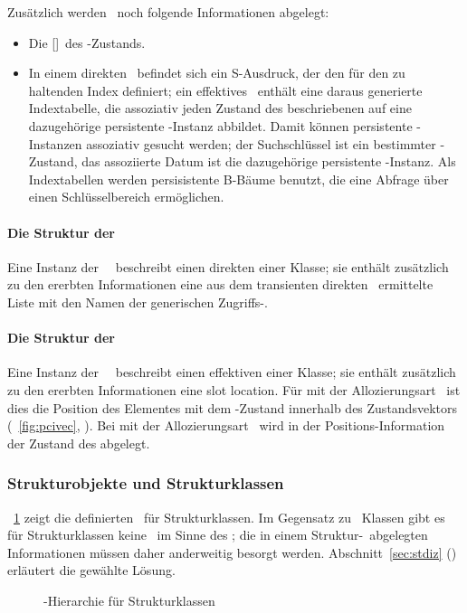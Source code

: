 %
Zus\"{a}tzlich werden \ua\ noch folgende Informationen abgelegt:
%
\begin{itemize}
%
\item Die []\ des \Slt\/-Zustands.
%
\item In einem direkten \sltdo\ befindet sich ein S-Ausdruck, der den
f\"{u}r den \Slt\/ zu haltenden Index definiert;
ein effektives \sltdo\ enth\"{a}lt eine daraus generierte Indextabelle,
die assoziativ jeden Zustand des beschriebenen \Slt[s]\/ auf eine
dazugeh\"{o}rige persistente \clos-Instanz abbildet. Damit k\"{o}n\-nen
persistente \clos-Instanzen assoziativ gesucht werden; der
Suchschl\"{u}ssel ist ein bestimmter \Slt\/-Zustand, das assoziierte Datum
ist die dazugeh\"{o}rige persistente \clos-Instanz. Als Indextabellen
werden persisistente B-B\"{a}ume benutzt, die eine Abfrage
\"{u}ber einen Schl\"{u}sselbereich erm\"{o}glichen.
%
\end{itemize}
%
\paragraph{Die Struktur der
\protect\sltdc\ \protect{}}
Eine Instanz der \clsdc\ \ beschreibt
einen direkten \Slt\/ einer Klasse; sie enth\"{a}lt zu\-s\"{a}tz\-lich zu
den ererbten Informationen eine aus dem transienten direkten
\sltmo\ ermittelte Liste mit den Namen der generischen
Zugriffs-\fn[en].
%
\paragraph{Die Struktur der
\protect\sltdc\ \protect{}}
%
Eine Instanz der \sltdc\ \ beschreibt
einen effektiven \Slt\/ einer Klasse; sie enth\"{a}lt zu\-s\"{a}tz\-lich zu
den ererbten Informationen eine
%
{slot location}. F\"{u}r \Slt[s]\/ mit der Allozierungsart
\ ist dies die Position des Elementes mit
dem \Slt\/-Zustand innerhalb des Zustandsvektors
(\figurename~\ref{fig:pcivec}, \citepage{\pageref{fig:pcivec}}).
Bei \Slt[s]\/ mit der Allozierungsart
\ wird in der Po\-si\-tions-In\-for\-ma\-tion der Zustand
des \Slt[s]\/ abgelegt.
%
\subsubsection{Strukturobjekte und Strukturklassen}
%
\figurename~\ref{fig:pltlscls} zeigt die definierten \dec[n]\ f\"{u}r
Strukturklassen. Im Gegensatz zu \clos\ Klassen gibt es f\"{u}r
Strukturklassen keine
\ im Sinne des \mop; die in einem Struktur-\clsdo\
abgelegten Informationen m\"{u}ssen daher anderweitig besorgt werden.
Abschnitt~\ref{sec:stdiz} (\citepage{\pageref{sec:stdiz}}) erl\"{a}utert
die gew\"{a}hlte L\"{o}sung.
%
\begin{figure}[htbp]%
\ifbuch%
\centerline{}%
\else%
\centerline{}%
\fi%
\caption{\protect\dec[n]-Hierarchie f\"{u}r Strukturklassen}%
\label{fig:pltlscls}%
\end{figure}%
%
